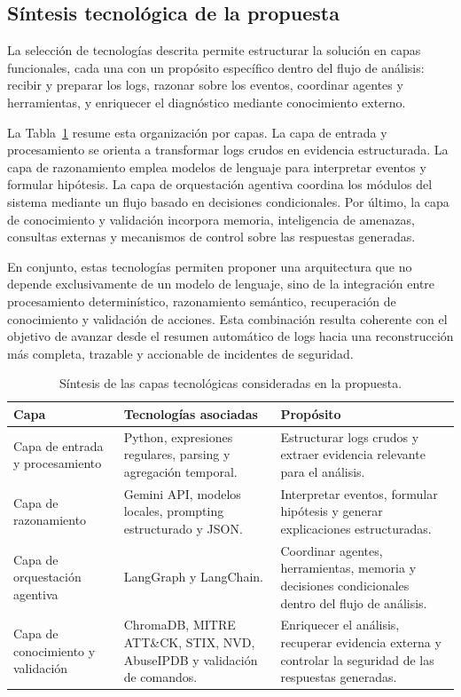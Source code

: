 \subsection{Síntesis tecnológica de la propuesta}

La selección de tecnologías descrita permite estructurar la solución en capas funcionales, cada una con un propósito específico dentro del flujo de análisis: recibir y preparar los logs, razonar sobre los eventos, coordinar agentes y herramientas, y enriquecer el diagnóstico mediante conocimiento externo.

La Tabla~\ref{tab:sintesis_tecnologica} resume esta organización por capas. La capa de entrada y procesamiento se orienta a transformar logs crudos en evidencia estructurada. La capa de razonamiento emplea modelos de lenguaje para interpretar eventos y formular hipótesis. La capa de orquestación agentiva coordina los módulos del sistema mediante un flujo basado en decisiones condicionales. Por último, la capa de conocimiento y validación incorpora memoria, inteligencia de amenazas, consultas externas y mecanismos de control sobre las respuestas generadas.

En conjunto, estas tecnologías permiten proponer una arquitectura que no depende exclusivamente de un modelo de lenguaje, sino de la integración entre procesamiento determinístico, razonamiento semántico, recuperación de conocimiento y validación de acciones. Esta combinación resulta coherente con el objetivo de avanzar desde el resumen automático de logs hacia una reconstrucción más completa, trazable y accionable de incidentes de seguridad.

\begin{table}[H]
\centering
\caption{Síntesis de las capas tecnológicas consideradas en la propuesta.}
\label{tab:sintesis_tecnologica}
\renewcommand{\arraystretch}{1.25}
\begin{tabularx}{\textwidth}{p{2.4cm} X X}
\toprule
\textbf{Capa} & \textbf{Tecnologías asociadas} & \textbf{Propósito} \\
\midrule
Capa de entrada y procesamiento & Python, expresiones regulares, parsing y agregación temporal. & Estructurar logs crudos y extraer evidencia relevante para el análisis. \\
\midrule
Capa de razonamiento & Gemini API, modelos locales, prompting estructurado y JSON. & Interpretar eventos, formular hipótesis y generar explicaciones estructuradas. \\
\midrule
Capa de orquestación agentiva & LangGraph y LangChain. & Coordinar agentes, herramientas, memoria y decisiones condicionales dentro del flujo de análisis. \\
\midrule
Capa de conocimiento y validación & ChromaDB, MITRE ATT\&CK, STIX, NVD, AbuseIPDB y validación de comandos. & Enriquecer el análisis, recuperar evidencia externa y controlar la seguridad de las respuestas generadas. \\
\bottomrule
\end{tabularx}
\end{table}



